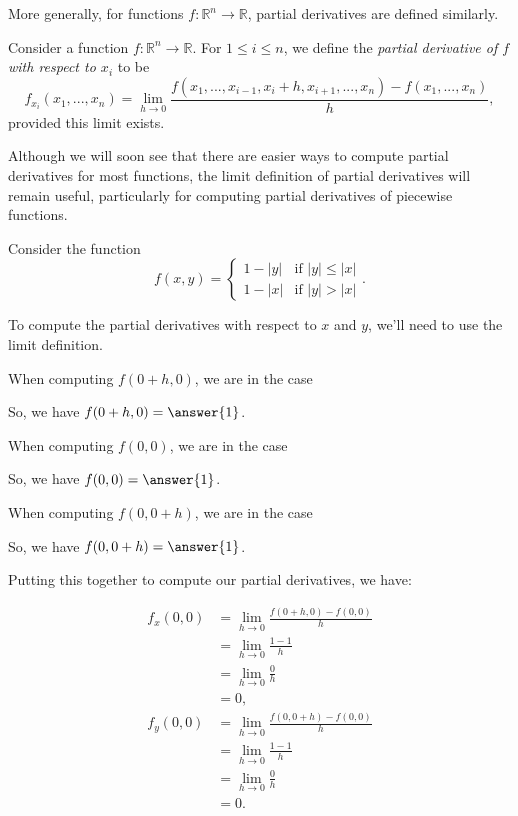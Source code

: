 \documentclass{ximera}
\begin{document}
More generally, for functions $f:\mathbb{R}^n\rightarrow \mathbb{R}$, partial derivatives are defined similarly.

\begin{definition}
Consider a function $f:\mathbb{R}^n\rightarrow\mathbb{R}$. For $1\leq i\leq n$, we define the \emph{partial derivative of $f$ with respect to $x_i$} to be
\[
f_{x_i}(x_1,...,x_n) = \lim_{h\rightarrow 0}\frac{f(x_1,...,x_{i-1}, x_i+h, x_{i+1},...,x_n)-f(x_1,...,x_n)}{h},
\]
provided this limit exists.
\end{definition}

Although we will soon see that there are easier ways to compute partial derivatives for most functions, the limit definition of partial derivatives will remain useful, particularly for computing partial derivatives of piecewise functions.

\begin{example}
Consider the function 
\[
f(x,y) = \begin{cases} 
      1-|y| & \text{if }|y|\leq |x| \\
      1-|x| & \text{if }|y| > |x|
   \end{cases}.
\]

To compute the partial derivatives with respect to $x$ and $y$, we'll need to use the limit definition.

When computing $f(0+h,0)$, we are in the case
\begin{multipleChoice}
\end{multipleChoice}

So, we have $f(0+h,0)=\answer{1}$.

When computing $f(0,0)$, we are in the case
\begin{multipleChoice}
\end{multipleChoice}

So, we have $f(0,0)=\answer{1}$.

When computing $f(0,0+h)$, we are in the case
\begin{multipleChoice}
\end{multipleChoice}

So, we have $f(0,0+h)=\answer{1}$.

Putting this together to compute our partial derivatives, we have:

\begin{align*}
f_x(0,0) &= \lim_{h\rightarrow 0}\frac{f(0+h,0)-f(0,0)}{h}\\
&= \lim_{h\rightarrow 0}\frac{1-1}{h}\\
&= \lim_{h\rightarrow 0}\frac{0}{h}\\
&= 0,\\
f_y(0,0) &= \lim_{h\rightarrow 0}\frac{f(0,0+h)-f(0,0)}{h}\\
&= \lim_{h\rightarrow 0}\frac{1-1}{h}\\
&= \lim_{h\rightarrow 0}\frac{0}{h}\\
&= 0.
\end{align*}


\end{example}
\end{document}
